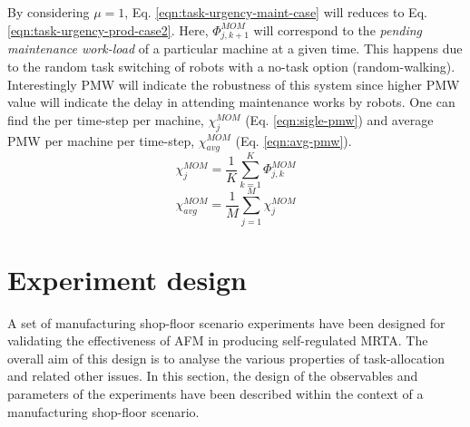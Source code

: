 By considering $\mu = 1$, Eq. \ref{eqn:task-urgency-maint-case} will reduces to Eq. \ref{eqn:task-urgency-prod-case2}. Here, $\Phi_{j, k+1}^{MOM}$ will correspond to the {\em pending maintenance work-load} of a particular machine at a given time. This happens due to the random task switching of robots with a no-task option (random-walking). Interestingly PMW will indicate the robustness of this system since higher PMW value will indicate the delay in attending maintenance works by robots. One can find the  per time-step per machine, $\chi_{j}^{MOM}$ (Eq. \ref{eqn:sigle-pmw}) and average PMW per machine per time-step, $\chi_{avg}^{MOM}$ (Eq. \ref{eqn:avg-pmw}).
\begin{equation}
\chi_{j}^{MOM}= \frac{1}{K} \sum_{k=1}^{K} \Phi_{j, k}^{MOM}
\label{eqn:sigle-pmw}
\end{equation}
\begin{equation}
\chi_{avg}^{MOM}= \frac{1}{M} \sum_{j=1}^{M} {\chi_{j}^{MOM}}
\label{eqn:avg-pmw}
\end{equation}
\section{Experiment design}
\label{afm:expt-design}
A set of  manufacturing shop-floor scenario experiments have been designed for validating the effectiveness of AFM in producing self-regulated MRTA.  The overall aim of this design is to analyse the various properties of task-allocation and related other issues. In this section,  the design of the observables and parameters of the experiments have been described within the context of a manufacturing shop-floor scenario. 
